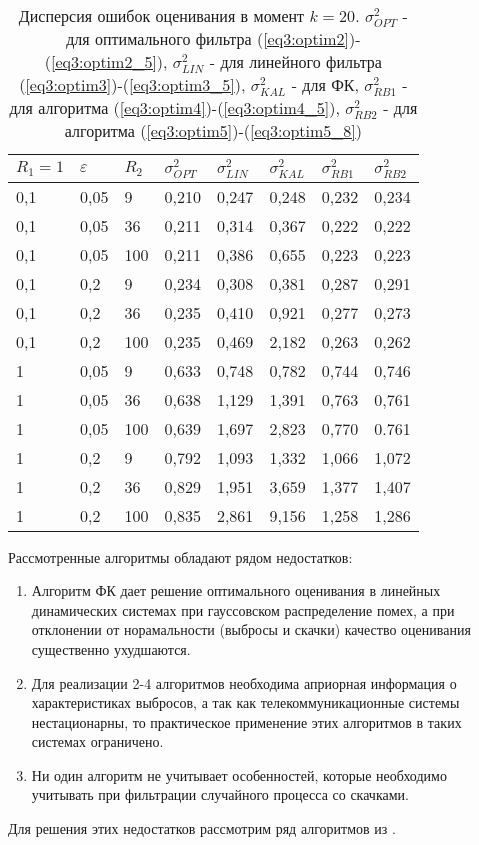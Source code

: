 \begin{table} [htbp]
  \centering
  \parbox{15cm}{\caption{Дисперсия ошибок оценивания в момент $k=20$. $\sigma_{OPT}^2$ - для оптимального фильтра (\ref{eq3:optim2})-(\ref{eq3:optim2_5}), $\sigma_{LIN}^2$ - для линейного фильтра (\ref{eq3:optim3})-(\ref{eq3:optim3_5}), $\sigma_{KAL}^2$ - для ФК, $\sigma_{RB1}^2$ - для алгоритма (\ref{eq3:optim4})-(\ref{eq3:optim4_5}), $\sigma_{RB2}^2$ - для алгоритма (\ref{eq3:optim5})-(\ref{eq3:optim5_8}) \cite{Klekis}} \label{disp_opt}} 
\begin{center}
\begin{tabular}{|l|l|l|l|l|l|l|l|} \hline \hline
$R_1=1$ & $\varepsilon$ & $R_2$ & $\sigma_{OPT}^2$ & $\sigma_{LIN}^2$ & $\sigma_{KAL}^2$ & $\sigma_{RB1}^2$ & $\sigma_{RB2}^2$\\\hline \hline
0,1 & 0,05 & 9 & 0,210 & 0,247 & 0,248 & 0,232 & 0,234\\\hline \hline
0,1 & 0,05 & 36 & 0,211 & 0,314 & 0,367 & 0,222 & 0,222\\\hline
0,1 & 0,05 & 100 & 0,211 & 0,386 & 0,655 & 0,223 & 0,223\\\hline
0,1 & 0,2 & 9 & 0,234 & 0,308 & 0,381 & 0,287 & 0,291\\\hline
0,1 & 0,2 & 36 & 0,235 & 0,410 & 0,921 & 0,277 & 0,273\\\hline
0,1 & 0,2 & 100 & 0,235 & 0,469 & 2,182 & 0,263 & 0,262\\\hline
1 & 0,05 & 9 & 0,633 & 0,748 & 0,782 & 0,744 & 0,746\\\hline
1 & 0,05 & 36 & 0,638 & 1,129 & 1,391 & 0,763 & 0,761\\\hline
1 & 0,05 & 100 & 0,639 & 1,697 & 2,823 & 0,770 & 0.761\\\hline
1 & 0,2 & 9 & 0,792 & 1,093 & 1,332 & 1,066 & 1,072\\\hline
1 & 0,2 & 36 & 0,829 & 1,951 & 3,659 & 1,377 & 1,407\\\hline
1 & 0,2 & 100 & 0,835 & 2,861 & 9,156 & 1,258 & 1,286\\\hline
\end{tabular}
\end{center}
\end{table}

Рассмотренные алгоритмы обладают рядом недостатков:
\begin{enumerate}
 \item Алгоритм ФК дает решение оптимального оценивания в линейных динамических системах при гауссовском распределение помех, а при отклонении от норамальности (выбросы и скачки) качество оценивания существенно ухудшаются.
 \item Для реализации 2-4 алгоритмов необходима априорная информация о характеристиках выбросов, а так как телекоммуникационные системы нестационарны, то практическое применение этих алгоритмов в таких системах ограничено.
 \item Ни один алгоритм не учитывает особенностей, которые необходимо учитывать при фильтрации случайного процесса со скачками.
\end{enumerate}
Для решения этих недостатков рассмотрим ряд алгоритмов из \cite{RobustFilter}.

